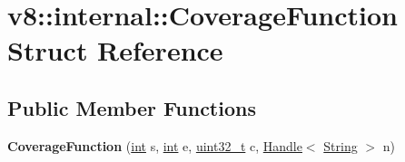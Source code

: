 \hypertarget{structv8_1_1internal_1_1CoverageFunction}{}\section{v8\+:\+:internal\+:\+:Coverage\+Function Struct Reference}
\label{structv8_1_1internal_1_1CoverageFunction}
\subsection*{Public Member Functions}
\begin{DoxyCompactItemize}
\item 
\mbox{\label{structv8_1_1internal_1_1CoverageFunction_af5169af9e76c2495e39e66df1906ff0b}} 
{\bfseries Coverage\+Function} (\mbox{\hyperlink{classint}{int}} s, \mbox{\hyperlink{classint}{int}} e, \mbox{\hyperlink{classuint32__t}{uint32\+\_\+t}} c, \mbox{\hyperlink{classv8_1_1internal_1_1Handle}{Handle}}$<$ \mbox{\hyperlink{classv8_1_1internal_1_1String}{String}} $>$ n)
\end{DoxyCompactItemize}
